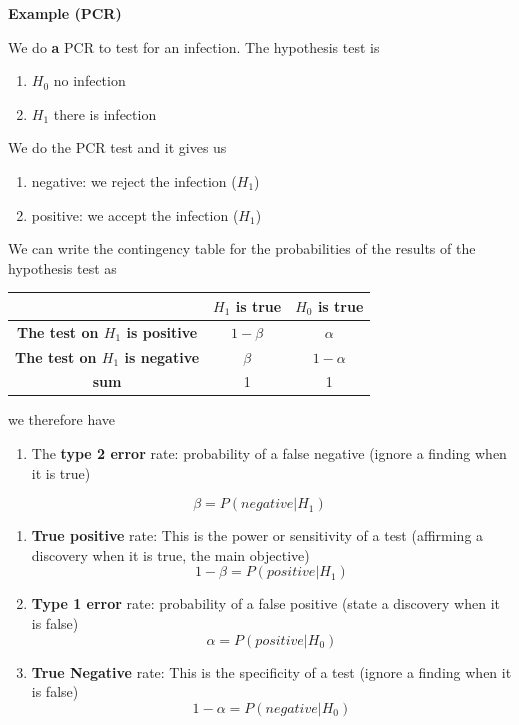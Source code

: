 \documentclass[
]{book}
\providecommand{\tightlist}{%
  \setlength{\itemsep}{0pt}\setlength{\parskip}{0pt}}
\begin{document}
\textbf{Example (PCR)}

We do \textbf{a} PCR to test for an infection. The hypothesis test is

\begin{enumerate}
\def\labelenumi{\alph{enumi}.}
\tightlist
\item
  \(H_0\) no infection
\item
  \(H_1\) there is infection
\end{enumerate}

We do the PCR test and it gives us

\begin{enumerate}
\def\labelenumi{\roman{enumi}.}
\tightlist
\item
  negative: we reject the infection (\(H_1\))
\item
  positive: we accept the infection (\(H_1\))
\end{enumerate}

We can write the contingency table for the probabilities of the results of the hypothesis test as

\begin{longtable}[]{@{}ccc@{}}
\toprule
& \(H_1\) is true & \(H_0\) is true \\
\midrule
\endhead
\textbf{The test on \(H_1\) is positive} & \(1-\beta\) & \(\alpha\) \\
\textbf{The test on \(H_1\) is negative} & \(\beta\) & \(1-\alpha\) \\
\textbf{sum} & 1 & 1 \\
\bottomrule
\end{longtable}

we therefore have

\begin{enumerate}
\def\labelenumi{\arabic{enumi}.}
\tightlist
\item
  The \textbf{type 2 error} rate: probability of a false negative (ignore a finding when it is true)
\end{enumerate}

\[\beta=P(negative|H_1)\]

\begin{enumerate}
\def\labelenumi{\arabic{enumi}.}
\setcounter{enumi}{1}
\item
  \textbf{True positive} rate: This is the power or sensitivity of a test (affirming a discovery when it is true, the main objective)
  \[1-\beta=P(positive|H_1)\]
\item
  \textbf{Type 1 error} rate: probability of a false positive (state a discovery when it is false)
  \[\alpha=P(positive|H_0)\]
\item
  \textbf{True Negative} rate: This is the specificity of a test (ignore a finding when it is false)
  \[1-\alpha=P(negative|H_0)\]
\end{enumerate}
\end{document}
